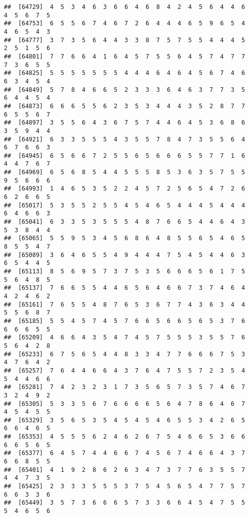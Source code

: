 \documentclass[
]{book}
\begin{document}
\begin{verbatim}
##  [64729]  4  5  3  4  6  3  6  6  4  6  8  4  2  4  5  6  4  4  6  4  5  6  7  5
##  [64753]  6  5  5  6  7  4  6  7  2  6  4  4  4  6  5  9  6  5  4  4  6  5  4  3
##  [64777]  3  7  3  5  6  4  4  3  3  8  7  5  7  5  5  4  4  4  5  2  5  1  5  6
##  [64801]  7  7  6  6  4  1  6  4  5  7  5  5  6  4  5  7  4  7  7  7  3  6  5  5
##  [64825]  5  5  5  5  5  5  5  4  4  4  6  4  6  4  5  6  7  4  6  6  3  4  5  4
##  [64849]  5  7  8  4  6  6  5  2  3  3  3  6  4  6  3  7  7  3  5  6  4  4  5  4
##  [64873]  6  6  6  5  5  6  2  3  5  3  4  4  4  3  5  2  8  7  7  6  5  5  6  7
##  [64897]  3  5  5  6  4  3  6  7  5  7  4  4  6  4  5  3  6  8  6  3  5  9  4  4
##  [64921]  6  3  3  5  5  5  4  3  5  5  7  8  4  7  3  5  5  6  4  6  7  6  6  3
##  [64945]  6  5  6  6  7  2  5  5  6  5  6  6  6  5  5  7  7  1  6  4  4  7  6  7
##  [64969]  6  5  6  8  5  4  4  5  5  5  8  5  3  6  3  5  7  5  5  9  5  6  6  6
##  [64993]  1  4  6  5  3  5  2  2  4  5  7  2  5  6  5  4  7  2  6  6  2  6  6  5
##  [65017]  5  3  5  5  2  5  5  4  5  4  6  5  4  4  4  5  4  4  4  6  4  6  6  3
##  [65041]  6  3  3  5  3  5  5  5  4  8  7  6  6  5  4  4  6  4  3  5  3  8  4  4
##  [65065]  5  5  9  5  3  4  5  6  8  6  4  8  5  5  6  5  4  6  5  8  5  5  4  7
##  [65089]  3  6  4  6  5  5  4  9  4  4  4  7  5  4  5  4  4  6  3  6  5  4  4  5
##  [65113]  8  5  6  9  5  7  3  7  5  3  5  6  6  6  5  6  1  7  5  5  6  4  8  5
##  [65137]  7  6  6  5  5  4  4  6  5  6  4  6  6  7  3  7  4  6  4  4  2  4  6  2
##  [65161]  7  6  5  5  4  8  7  6  5  3  6  7  7  4  3  6  3  4  4  5  5  6  8  7
##  [65185]  5  5  4  5  7  4  5  7  6  6  5  6  6  5  6  5  3  7  6  6  6  6  5  5
##  [65209]  4  6  6  4  3  5  4  7  4  5  7  5  5  5  3  5  5  7  6  5  6  4  2  8
##  [65233]  6  7  5  6  5  4  4  8  3  3  4  7  7  6  6  6  7  5  3  4  7  6  4  2
##  [65257]  7  6  4  4  6  6  4  3  7  6  4  7  5  5  7  2  3  5  4  5  4  4  6  6
##  [65281]  7  4  2  3  2  3  1  7  3  5  6  5  7  3  5  7  4  6  7  3  2  4  9  2
##  [65305]  5  3  3  5  6  7  6  6  6  6  5  6  4  7  8  6  4  6  7  4  5  4  5  5
##  [65329]  3  5  6  5  3  5  4  5  4  5  4  6  5  5  3  4  2  6  5  6  6  4  6  5
##  [65353]  4  5  5  5  6  2  4  6  2  6  7  5  4  6  6  5  3  6  6  6  6  5  6  5
##  [65377]  6  4  5  7  4  4  6  6  7  4  5  6  7  4  6  6  4  3  7  6  6  8  5  5
##  [65401]  4  1  9  2  8  6  2  6  3  4  7  3  7  7  6  3  5  5  7  4  4  7  3  5
##  [65425]  2  3  3  3  5  5  5  3  7  5  4  5  6  5  4  7  7  5  7  6  6  3  3  6
##  [65449]  3  5  7  3  6  6  6  5  7  3  3  6  6  4  5  4  7  5  5  5  4  6  5  6

\end{verbatim}
\end{document}
